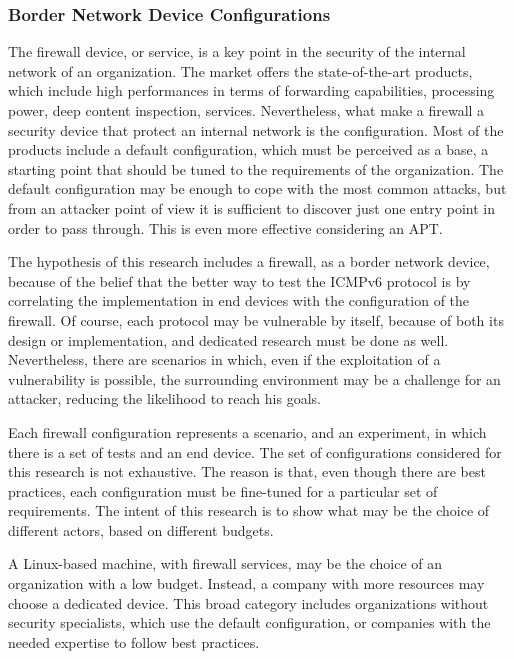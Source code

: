 \documentclass[12pt]{article}
\begin{document}
\subsubsection{Border Network Device Configurations}
\label{subsub:borderConfig}

The firewall device, or service, is a key point in the security of the internal network of an organization. The market offers the state-of-the-art products, which include high performances in terms of forwarding capabilities, processing power, deep content inspection, services. Nevertheless, what make a firewall a security device that protect an internal network is the configuration. Most of the products include a default configuration, which must be perceived as a base, a starting point that should be tuned to the requirements of the organization. The default configuration may be enough to cope with the most common attacks, but from an attacker point of view it is sufficient to discover just one entry point in order to pass through. This is even more effective considering an APT.

The hypothesis of this research includes a firewall, as a border network device, because of the belief that the better way to test the ICMPv6 protocol is by correlating the implementation in end devices with the configuration of the firewall. Of course, each protocol may be vulnerable by itself, because of both its design or implementation, and dedicated research must be done as well. Nevertheless, there are scenarios in which, even if the exploitation of a vulnerability is possible, the surrounding environment may be a challenge for an attacker, reducing the likelihood to reach his goals.

Each firewall configuration represents a scenario, and an experiment, in which there is a set of tests and an end device. The set of configurations considered for this research is not exhaustive. The reason is that, even though there are best practices, each configuration must be fine-tuned for a particular set of requirements. The intent of this research is to show what may be the choice of different actors, based on different budgets.

A Linux-based machine, with firewall services, may be the choice of an organization with a low budget. Instead, a company with more resources may choose a dedicated device. This broad category includes organizations without security specialists, which use the default configuration, or companies with the needed expertise to follow best practices. 
\end{document}
